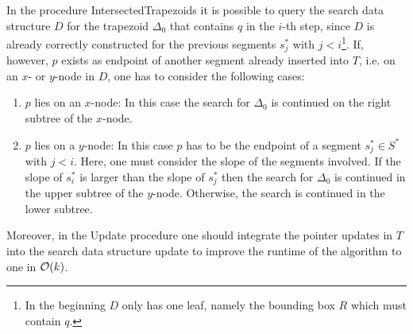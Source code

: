         \begin{remark}
            In the procedure IntersectedTrapezoids it is possible to query the search data structure $D$ for the trapezoid $\Delta_0$ that contains $q$ in the $i$-th step, since $D$ is already correctly constructed for the previous segments $s^\ast_j$ with $j < i$\footnote{In the beginning $D$ only has one leaf, namely the bounding box $R$ which must contain $q$.}. If, however, $p$ exists as endpoint of another segment already inserted into $T$, i.e. on an $x$- or $y$-node in $D$, one has to consider the following cases: 
            \begin{enumerate}
                \item $p$ lies on an $x$-node: In this case the search for $\Delta_0$ is continued on the right subtree of the $x$-node.
                
                \item $p$ lies on a $y$-node: In this case $p$ has to be the endpoint of a segment $s^\ast_j \in S^\ast$ with $j < i$. Here, one must consider the slope of the segments involved. If the slope of $s^\ast_i$ is larger than the slope of $s^\ast_j$ then the search for $\Delta_0$ is continued in the upper subtree of the $y$-node. Otherwise, the search is continued in the lower subtree.
            \end{enumerate}
            Moreover, in the Update procedure one should integrate the pointer updates in $T$ into the search data structure update to improve the runtime of the algorithm to one in $\mathcal{O}(k)$.
        \end{remark}

